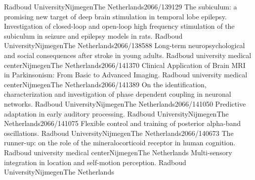 	{Radboud University}{Nijmegen}{The Netherlands}{2066/139129}
	{The subiculum: a promising new target of deep brain stimulation in temporal lobe epilepsy. Investigation of closed-loop and open-loop high frequency stimulation of the subiculum in seizure and epilepsy models in rats.}
	{Radboud University}{Nijmegen}{The Netherlands}{2066/138588}
	{Long-term neuropsychological and social consequences after stroke in young adults.}
	{Radboud university medical center}{Nijmegen}{The Netherlands}{2066/141370}
	{Clinical Application of Brain MRI in Parkinsonism: From Basic to Advanced Imaging.}
	{Radboud university medical center}{Nijmegen}{The Netherlands}{2066/141389}
	{On the identification, characterization and investigation of phase dependent coupling in neuronal networks.}
	{Radboud University}{Nijmegen}{The Netherlands}{2066/141050}
	{Predictive adaptation in early auditory processing.}
	{Radboud University}{Nijmegen}{The Netherlands}{2066/141075}
	{Flexible control and training of posterior alpha-band oscillations.}
	{Radboud University}{Nijmegen}{The Netherlands}{2066/140673}
	{The runner-up: on the role of the mineralocorticoid receptor in human cognition.}
	{Radboud university medical center}{Nijmegen}{The Netherlands}{}
	{Multi-sensory integration in location and self-motion perception.}
	{Radboud University}{Nijmegen}{The Netherlands}{}
